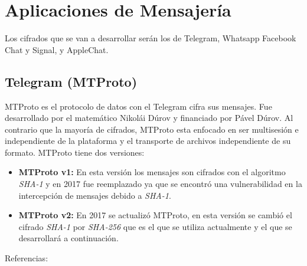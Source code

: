 \chapter{Aplicaciones de Mensajería}

Los cifrados que se van a desarrollar serán los de Telegram, Whatsapp Facebook Chat y Signal, y AppleChat.

\section{Telegram (MTProto)}
MTProto es el protocolo de datos con el Telegram cifra sus mensajes. Fue desarrollado por el matemático Nikolái Dúrov y financiado por Pável Dúrov. Al contrario que la mayoría de cifrados, MTProto esta enfocado en ser multisesión e independiente de la plataforma y el transporte de archivos independiente de su formato. MTProto tiene dos versiones:
\begin{itemize}
	\item \textbf{MTProto v1:} En esta versión los mensajes son cifrados con el algoritmo \emph{SHA-1} y en 2017 fue reemplazado ya que se encontró una vulnerabilidad en la intercepción de mensajes debido a \emph{SHA-1}.
	\item \textbf{MTProto v2:} En 2017 se actualizó MTProto, en esta versión se cambió el cifrado \emph{SHA-1} por \emph{SHA-256} que es el que se utiliza actualmente y el que se desarrollará a continuación.
\end{itemize}
Referencias: \cite{Miculan2021} \cite{WebProto}

